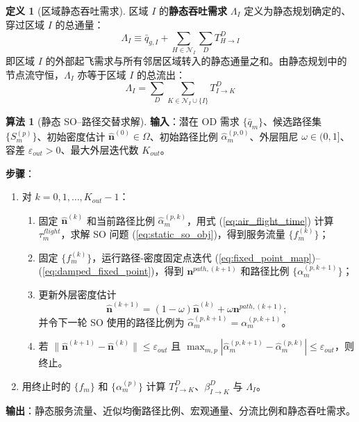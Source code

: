 \documentclass[a4paper,12pt]{article}
\theoremstyle{plain}
\theoremstyle{definition}
\newtheorem{definition}[theorem]{定义}
\newtheorem{algorithm}[theorem]{算法}
\theoremstyle{remark}
\begin{document}
\begin{definition}[区域静态吞吐需求]\label{def:lambda}
区域 $I$ 的\textbf{静态吞吐需求} $\Lambda_I$ 定义为静态规划确定的、穿过区域 $I$ 的总通量：
\begin{equation}\label{eq:lambda_def}
    \Lambda_I \equiv \bar{q}_{g,I} + \sum_{H \in \mathcal{N}_I} \sum_D T_{H \to I}^D
\end{equation}
即区域 $I$ 的外部起飞需求与所有邻居区域转入的静态通量之和。由静态规划中的节点流守恒，$\Lambda_I$ 亦等于区域 $I$ 的总流出：
\begin{equation}\label{eq:lambda_outflow}
    \Lambda_I = \sum_D \sum_{K \in \mathcal{N}_I \cup \{I\}} T_{I \to K}^D
\end{equation}
\end{definition}

\begin{algorithm}[静态 SO--路径交替求解]\label{alg:static_path_coupling}
\textbf{输入}：潜在 OD 需求 $\{\bar q_m\}$、候选路径集 $\{S_m^{(p)}\}$、初始密度估计 $\hat{\bm n}^{(0)}\in\Omega$、初始路径比例 $\widehat\alpha_m^{(p,0)}$、外层阻尼 $\omega\in(0,1]$、容差 $\varepsilon_{out}>0$、最大外层迭代数 $K_{out}$。

\textbf{步骤}：
\begin{enumerate}
    \item 对 $k=0,1,\ldots,K_{out}-1$：
    \begin{enumerate}
        \item 固定 $\hat{\bm n}^{(k)}$ 和当前路径比例 $\widehat\alpha_m^{(p,k)}$，用式 (\ref{eq:air_flight_time}) 计算 $\tau_m^{flight}$，求解 SO 问题 (\ref{eq:static_so_obj})，得到服务流量 $\{f_m^{(k)}\}$；
        \item 固定 $\{f_m^{(k)}\}$，运行路径-密度固定点迭代 (\ref{eq:fixed_point_map})--(\ref{eq:damped_fixed_point})，得到 $\bm n^{path,(k+1)}$ 和路径比例 $\{\alpha_m^{(p,k+1)}\}$；
        \item 更新外层密度估计
        \begin{equation}
            \hat{\bm n}^{(k+1)}=(1-\omega)\hat{\bm n}^{(k)}+\omega\bm n^{path,(k+1)} ;
        \end{equation}
        并令下一轮 SO 使用的路径比例为 $\widehat\alpha_m^{(p,k+1)}=\alpha_m^{(p,k+1)}$。
        \item 若 $\|\hat{\bm n}^{(k+1)}-\hat{\bm n}^{(k)}\|\le\varepsilon_{out}$ 且 $\max_{m,p}|\widehat\alpha_m^{(p,k+1)}-\widehat\alpha_m^{(p,k)}|\le\varepsilon_{out}$，则终止。
    \end{enumerate}
    \item 用终止时的 $\{f_m\}$ 和 $\{\alpha_m^{(p)}\}$ 计算 $T_{I\to K}^D$、$\beta_{I\to K}^D$ 与 $\Lambda_I$。
\end{enumerate}

\textbf{输出}：静态服务流量、近似均衡路径比例、宏观通量、分流比例和静态吞吐需求。
\end{algorithm}
\end{document}
